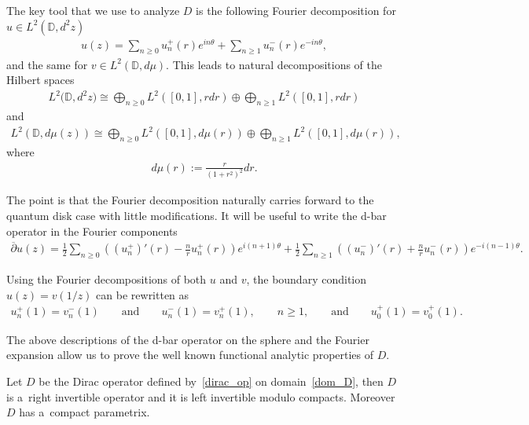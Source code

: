 The key tool that we use to analyze $D$ is the following Fourier decomposition for $u\in L^2({\mathbb D},d^2z)$
\begin{gather*}
u(z) = \sum\limits_{n\ge0} u_n^+(r) e^{in\theta} + \sum\limits_{n\ge1}u_n^-(r)e^{-in\theta},
\end{gather*}
and the same for $v\in L^2({\mathbb D},d\mu)$.
This leads to natural decompositions of the Hilbert spaces
\begin{gather*}
L^2\big({\mathbb D}, d^2z\big) \cong \bigoplus_{n\ge0} L^2\left([0,1],rdr\right)\oplus \bigoplus_{n\ge
1}L^2\left([0,1],rdr\right)
\end{gather*}
and
\begin{gather*}
L^2({\mathbb D},d\mu(z)) \cong \bigoplus_{n\ge0} L^2\left([0,1], d\mu(r)\right) \oplus \bigoplus_{n\ge1} L^2\left([0,1],d\mu(r)\right),
\end{gather*}
where
\begin{gather*}
d\mu(r):= \frac{r}{(1+r^2)^2}dr.
\end{gather*}

The point is that the Fourier decomposition naturally carries forward to the quantum disk case with little
modif\/ications.
It will be useful to write the d-bar operator in the Fourier components
\begin{gather}
\label{classDTO}
\overline{\partial}u(z) = \frac{1}{2}\sum\limits_{n\ge0}\!\left(\left(u_n^+\right)'(r) - \frac{n}{r}u_n^+(r)\right)e^{i(n+1)\theta}
+ \frac{1}{2}\sum\limits_{n\ge1}\!\left(\left(u_n^-\right)'(r) + \frac{n}{r}u_n^-(r)\right)e^{-i(n-1)\theta}.
\end{gather}

Using the Fourier decompositions of both $u$ and $v$, the boundary condition $u(z)=v(1/z)$ can be rewritten as
\begin{gather}
\label{bcft}
u_n^+(1) = v_n^-(1)
\qquad
\textrm{and}
\qquad
u_n^-(1) = v_n^+(1),
\qquad
n\ge 1,
\qquad
\textrm{and}
\qquad
u_0^+(1) = v_0^+(1).
\end{gather}

The above descriptions of the d-bar operator on the sphere and the Fourier expansion allow us to prove the well known
functional analytic properties of $D$.

\begin{theo}\label{compact_para_cont}
Let $D$ be the Dirac operator defined by~\eqref{dirac_op} on domain~\eqref{dom_D}, then $D$ is a~right invertible
operator and it is left invertible modulo compacts.
Moreover $D$ has a~compact parametrix.
\end{theo}

